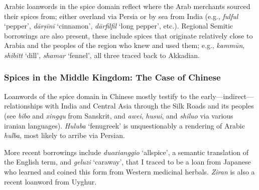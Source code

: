 Arabic loanwords in the spice domain reflect where the Arab merchants sourced their spices from; either overland via Persia or by sea from India (e.g., \textit{fulful} `pepper', \textit{dārṣīnī} `cinnamon', \textit{dārfilfil} `long pepper', etc.). Regional Semitic borrowings are also present, these include spices that originate relatively close to Arabia and the peoples of the region who knew and used them; e.g., \textit{kammūn}, \textit{shibitt} `dill', \textit{shamar} `fennel', all three traced back to Akkadian.

\subsubsection{Spices in the Middle Kingdom: The Case of Chinese }

Loanwords of the spice domain in Chinese mostly testify to the early---indirect---relationships with India and Central Asia through the Silk Roads and its peoples (see \textit{bibo} and \textit{xingqu} from Sanskrit, and \textit{awei}, \textit{husui}, and \textit{shiluo} via various iranian languages). \textit{Huluba} `fenugreek' is unquestionably a rendering of Arabic \textit{hulba}, most likely to arribe via Persian.

More recent borrowings include \textit{duoxianggio} `allspice', a semantic translation of the English term, and \textit{geluzi} `caraway', that I traced to be a loan from Japanese who learned and coined this form from Western medicinal herbals. \textit{Ziran} is also a recent loanword from Uyghur.

